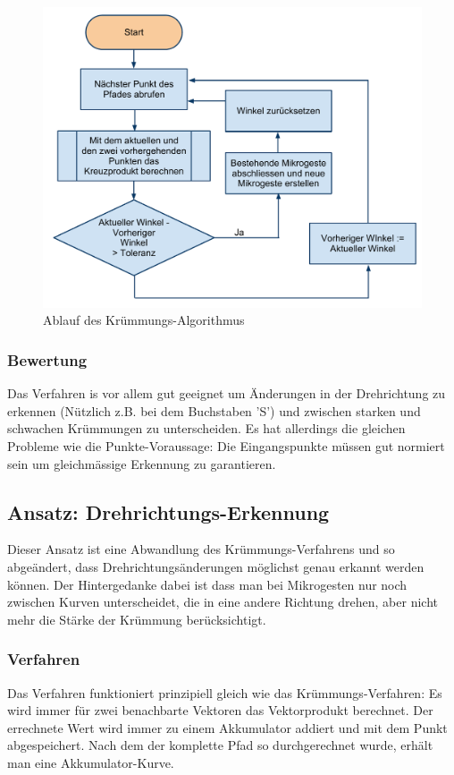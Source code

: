 \begin{figure}[h!]
  \centering
    \includegraphics[width=\textwidth]{./img/CurvatureFlowchart.pdf}
  \caption{Ablauf des Krümmungs-Algorithmus}
  \label{curvatureflowchart}
\end{figure}

\subsubsection{Bewertung}
Das Verfahren is vor allem gut geeignet um Änderungen in der Drehrichtung zu erkennen (Nützlich z.B. bei dem Buchstaben 'S') und zwischen starken und schwachen Krümmungen zu unterscheiden. Es hat allerdings die gleichen Probleme wie die Punkte-Voraussage: Die Eingangspunkte müssen gut normiert sein um gleichmässige Erkennung zu garantieren. 


\subsection{Ansatz: Drehrichtungs-Erkennung}
Dieser Ansatz ist eine Abwandlung des Krümmungs-Verfahrens und so abgeändert, dass Drehrichtungsänderungen möglichst genau erkannt werden können. Der Hintergedanke dabei ist dass man bei Mikrogesten nur noch zwischen Kurven unterscheidet, die in eine andere Richtung drehen, aber nicht mehr die Stärke der Krümmung berücksichtigt.

\subsubsection{Verfahren}
Das Verfahren funktioniert prinzipiell gleich wie das Krümmungs-Verfahren: Es wird immer für zwei benachbarte Vektoren das Vektorprodukt berechnet. Der errechnete Wert wird immer zu einem Akkumulator addiert und mit dem Punkt abgespeichert. Nach dem der komplette Pfad so durchgerechnet wurde, erhält man eine Akkumulator-Kurve.

